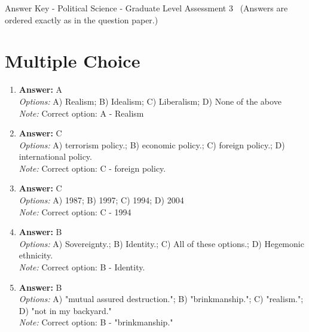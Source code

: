 \documentclass[12pt]{article}
\begin{document}
\begin{center}
Answer Key - Political Science - Graduate Level Assessment 3 \
\small (Answers are ordered exactly as in the question paper.)
\end{center}

\section*{Multiple Choice}
\begin{enumerate}[label=\arabic*.]
\item \textbf{Answer:} A
\\ \textit{Options:} A) Realism; B) Idealism; C) Liberalism; D) None of the above
\\ \textit{Note:} Correct option: A - Realism
\item \textbf{Answer:} C
\\ \textit{Options:} A) terrorism policy.; B) economic policy.; C) foreign policy.; D) international policy.
\\ \textit{Note:} Correct option: C - foreign policy.
\item \textbf{Answer:} C
\\ \textit{Options:} A) 1987; B) 1997; C) 1994; D) 2004
\\ \textit{Note:} Correct option: C - 1994
\item \textbf{Answer:} B
\\ \textit{Options:} A) Sovereignty.; B) Identity.; C) All of these options.; D) Hegemonic ethnicity.
\\ \textit{Note:} Correct option: B - Identity.
\item \textbf{Answer:} B
\\ \textit{Options:} A) "mutual assured destruction."; B) "brinkmanship."; C) "realism."; D) "not in my backyard."
\\ \textit{Note:} Correct option: B - "brinkmanship."
\end{enumerate}
\end{document}
